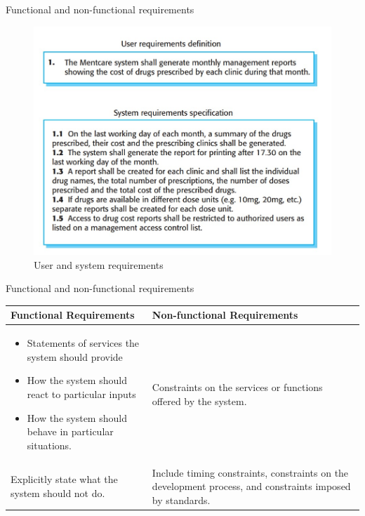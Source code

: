 \documentclass{beamer}
\begin{document}
\begin{frame}{Functional and non-functional requirements}
		\begin{figure}
		\includegraphics[scale=.5]{img/m2_1.jpg}
		\caption{User and 
			system requirements}
	\end{figure}
\end{frame}
\begin{frame}{Functional and non-functional requirements}
	\begin{center}
		\begin{tabular}{| p{5cm} | p{5cm} |}
			\hline
			\textbf{Functional Requirements} & \textbf{Non-functional Requirements}  \\ 
			\hline
			\begin{itemize}
				\item Statements of services the 
				system should provide
				\item How the 
				system should react to particular 
				inputs
				\item How the system 
				should behave in particular 
				situations.
			\end{itemize}
	 &  Constraints on the services or 
			functions offered by the system.
 \\  
			\hline
		 Explicitly state what the system 
		should not do. & Include timing constraints, 
		constraints on the development 
		process, and constraints 
		imposed by standards. \\
			\hline
		\end{tabular}
	\end{center}
\end{frame}
\end{document}
